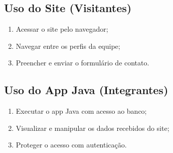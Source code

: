 \documentclass[12pt]{article}
\begin{document}
\subsection*{Uso do Site (Visitantes)}
\begin{enumerate}
    \item Acessar o site pelo navegador;
    \item Navegar entre os perfis da equipe;
    \item Preencher e enviar o formulário de contato.
\end{enumerate}

\subsection*{Uso do App Java (Integrantes)}
\begin{enumerate}
    \item Executar o app Java com acesso ao banco;
    \item Visualizar e manipular os dados recebidos do site;
    \item Proteger o acesso com autenticação.
\end{enumerate}
\end{document}
